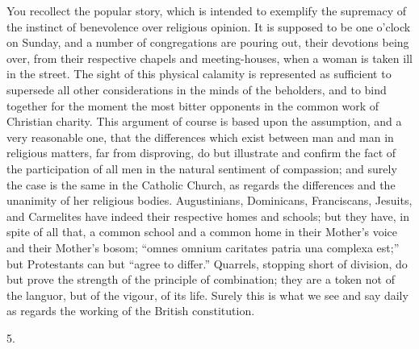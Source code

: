 You recollect the popular story, which is intended to exemplify the
supremacy of the instinct of benevolence over religious opinion. It is
supposed to be one o'clock on Sunday, and a number of congregations
are pouring out, their devotions being over, from their respective
chapels and meeting-houses, when a woman is taken ill in the street.
The sight of this physical calamity is represented as sufficient to
supersede all other considerations in the minds of the beholders, and
to bind together for the moment the most bitter opponents in the
common work of Christian charity. This argument of course is based
upon the assumption, and a very reasonable one, that the differences
which exist between man and man in religious matters, far from
disproving, do but illustrate and confirm the fact of the
participation of all men in the natural sentiment of compassion; and
surely the case is the same in the Catholic Church, as regards the
differences and the unanimity of her religious bodies. Augustinians,
Dominicans, Franciscans, Jesuits, and Carmelites have indeed their
respective homes and schools; but they have, in spite of all that, a
common school and a common home in their Mother's voice and their
Mother's bosom; ``omnes omnium caritates patria una complexa est;''
but Protestants can but ``agree to differ.'' Quarrels,
stopping short of division, do but prove the strength of the principle
of combination; they are a token not of the languor, but of the vigour,
of its life. Surely this is what we see and say daily as regards the
working of the British constitution.

5.

